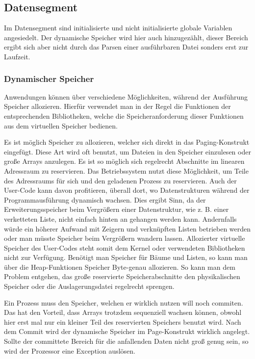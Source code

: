 \documentclass[12pt]{book}
\begin{document}
\subsection{Datensegment}

Im Datensegment sind initialisierte und nicht initialisierte globale Variablen
angesiedelt. Der dynamische Speicher wird hier auch hinzugezählt, dieser Bereich
ergibt sich aber nicht durch das Parsen einer ausführbaren Datei sonders erst
zur Laufzeit.

\subsubsection{Dynamischer Speicher}

Anwendungen können über verschiedene Möglichkeiten, während der Ausführung
Speicher allozieren. Hierfür verwendet man in der Regel die Funktionen der
entsprechenden Bibliotheken, welche die Speicheranforderung dieser Funktionen
aus dem virtuellen Speicher bedienen.

Es ist möglich Speicher zu allozieren, welcher sich direkt in das
Paging-Konstrukt eingefügt. Diese Art wird oft benutzt, um Dateien in den
Speicher einzulesen oder große Arrays anzulegen. Es ist so möglich sich
regelrecht Abschnitte im linearen Adressraum zu reservieren. Das
Betriebssystem nutzt diese Möglichkeit, um Teile des Adressraums für sich und
den geladenen Prozess zu reservieren. Auch der User-Code kann davon
profitieren, überall dort, wo Datenstrukturen während der Programmausführung
dynamisch wachsen. Dies ergibt Sinn, da der Erweiterungsspeicher beim
Vergrößern einer Datenstruktur, wie z. B. einer verketteten Liste, nicht
einfach hinten an gehangen werden kann. Andernfalls würde ein höherer Aufwand
mit Zeigern und verknüpften Listen betrieben werden oder man müsste Speicher
beim Vergrößern wandern lassen. Allozierter virtuelle Speicher des User-Codes
steht somit dem Kernel oder verwendeten Bibliotheken nicht zur Verfügung.
Benötigt man Speicher für Bäume und Listen, so kann man über die
Heap-Funktionen Speicher Byte-genau allozieren. So kann man dem Problem
entgehen, das große reservierte Speicherabschnitte den physikalischen Speicher
oder die Auslagerungsdatei regelrecht sprengen.

Ein Prozess muss den Speicher, welchen er wirklich nutzen will noch commiten.
Das hat den Vorteil, dass Arrays trotzdem sequenziell wachsen können, obwohl
hier erst mal nur ein kleiner Teil des reservierten Speichers benutzt wird.
Nach dem Commit wird der dynamische Speicher im Page-Konstrukt wirklich
angelegt. Sollte der committete Bereich für die anfallenden Daten nicht groß
genug sein, so wird der Prozessor eine Exception auslösen.
\end{document}
